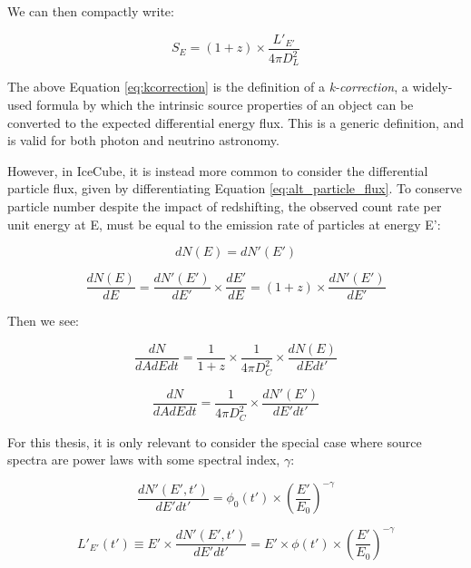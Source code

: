 We can then compactly write:

\begin{equation}
S_{E} = (1+z) \times \frac{L'_{E'}}{4 \pi D_{L}^{2}}
\label{eq:kcorrection}
\end{equation}

The above Equation \ref{eq:kcorrection} is the definition of a \emph{k-correction}, a widely-used formula by which the intrinsic source properties of an object can be converted to the expected differential energy flux. This is a generic definition, and is valid for both photon and neutrino astronomy. 

However, in IceCube, it is instead more common to consider the differential particle flux, given by differentiating Equation \ref{eq:alt_particle_flux}. To conserve particle number despite the impact of redshifting, the observed count rate per unit energy at E, must be equal to the emission rate of particles at energy E':

\begin{equation}
dN(E) = dN'(E')
\end{equation}

\begin{equation}
\frac{dN(E)}{dE} = \frac{dN'(E')}{dE'} \times \frac{dE'}{dE} = (1+z) \times \frac{dN'(E')}{dE'}
\end{equation}

Then we see:

\begin{equation}
\frac{dN}{dAdE dt} = \frac{1}{1+z} \times \frac{1}{4 \pi D_{C}^{2}} \times \frac{dN(E)}{dEdt'}
\end{equation}

\begin{equation}
\frac{dN}{dAdEdt}= \frac{1}{4 \pi D_{C}^{2}} \times \frac{dN'(E')}{dE'dt'}
\end{equation}

For this thesis, it is only relevant to consider the special case where source spectra are power laws with some spectral index, $\gamma$:

\begin{equation}
\frac{dN'(E', t')}{dE'dt'} = \phi_{0}(t') \times \left( \frac{E'}{E_{0}}\right) ^{-\gamma}
\label{eq:def_pl}
\end{equation}

\begin{equation}
L'_{E'}(t') \equiv E' \times \frac{dN'(E', t')}{dE'dt'} = E' \times \phi(t') \times \left( \frac{E'}{E_{0}}\right) ^{-\gamma}
\label{eq:def_le}
\end{equation}

